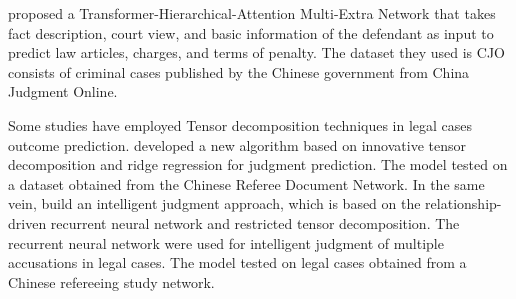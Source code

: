 \documentclass[sn-mathphys,Numbered]{sn-jnl}%
\theoremstyle{thmstyleone}%
\theoremstyle{thmstyletwo}%
\theoremstyle{thmstylethree}%
\begin{document}
\citet{zhu2020legal} proposed a Transformer-Hierarchical-Attention Multi-Extra Network that takes fact description, court view, and basic information of the defendant as input to predict law articles, charges, and terms of penalty. The dataset they used is CJO consists of criminal cases published by the Chinese government from China Judgment Online. 




Some studies have employed Tensor decomposition techniques in legal cases outcome prediction. \citet{guo2020tenrr} developed a new algorithm based on innovative tensor decomposition and ridge regression for judgment prediction. The model tested on a dataset obtained from the Chinese Referee Document Network.%
In the same vein, \citet{guo2019rnrtd} build an intelligent judgment approach, which is based on the relationship-driven recurrent neural network and restricted tensor decomposition. %
The recurrent neural network were used for intelligent judgment of multiple accusations in legal cases. The model tested on legal cases obtained from a Chinese refereeing study network.%
\end{document}
